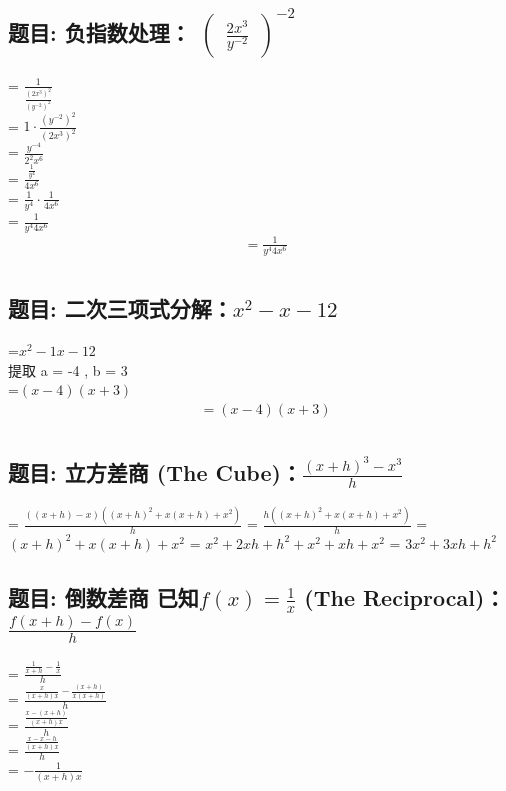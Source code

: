 \documentclass[12pt]{article}
\begin{document}
\subsection*{题目: 负指数处理： $\begin{pmatrix}
  \frac{2x^{3}}{y^{-2}}
\end{pmatrix}^{-2}$}
= $\frac{1}{\frac{(2x^{3})^{2}}{(y^{-2})^{2}}}$ \\
= $1 \cdot \frac{(y^{-2})^{2}}{(2x^{3})^{2}}$\\
= $\frac{y^{-4}}{2^{2}x^{6}}$\\
= $\frac{\frac{1}{y^{4}}}{4x^{6}}$\\
= $\frac{1}{y^{4}} \cdot \frac{1}{4x^{6}}$\\
= $\frac{1}{y^{4}4x^{6}}$\\
\begin{align*}
  &= \frac{1}{y^{4}4x^{6}} \\
\end{align*}

\subsection*{题目: 二次三项式分解：$x^{2}-x-12$}
=$x^{2} -1x -12$\\
提取 a = -4 , b = 3\\
=$(x - 4)(x + 3)$\\
\begin{align*}
  &= (x - 4)(x + 3) \\
\end{align*}

\subsection*{题目: 立方差商 (The Cube)：$\frac{(x+h)^{3}-x^{3}}{h}$}
= $\frac{((x + h) - x)((x+h)^{2} + x(x+h) + x^{2})}{h}$
= $\frac{h((x+h)^{2} + x(x+h) + x^{2})}{h}$
= $(x+h)^{2} + x(x+h) + x^{2}$
= $x^{2} + 2xh + h^{2} + x^{2} + xh + x^{2}$
= $3x^{2} + 3xh  + h^{2}$


\subsection*{题目: 倒数差商 已知$f(x) = \frac{1}{x}$ (The Reciprocal)：$\frac{f(x+h)-f(x)}{h}$}
= $\frac{\frac{1}{x+h} - \frac{1}{x}}{h}$ \\
= $\frac{\frac{x}{(x+h)x} - \frac{(x+h)}{x(x+h)}}{h}$ \\
= $\frac{\frac{x- (x+h)}{(x+h)x}}{h}$\\
= $\frac{\frac{x- x -h}{(x+h)x}}{h}$\\
= ${-\frac{1}{(x+h)x}}$\\
\end{document}
